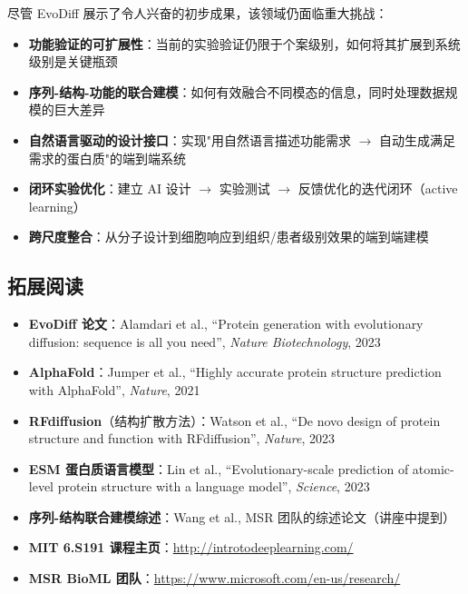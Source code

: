 尽管 EvoDiff 展示了令人兴奋的初步成果，该领域仍面临重大挑战：

\begin{itemize}
    \item \textbf{功能验证的可扩展性}：当前的实验验证仍限于个案级别，如何将其扩展到系统级别是关键瓶颈
    \item \textbf{序列-结构-功能的联合建模}：如何有效融合不同模态的信息，同时处理数据规模的巨大差异
    \item \textbf{自然语言驱动的设计接口}：实现"用自然语言描述功能需求 $\rightarrow$ 自动生成满足需求的蛋白质"的端到端系统
    \item \textbf{闭环实验优化}：建立 AI 设计 $\rightarrow$ 实验测试 $\rightarrow$ 反馈优化的迭代闭环（active learning）
    \item \textbf{跨尺度整合}：从分子设计到细胞响应到组织/患者级别效果的端到端建模
\end{itemize}

\subsection{拓展阅读}

\begin{itemize}
    \item \textbf{EvoDiff 论文}：Alamdari et al., ``Protein generation with evolutionary diffusion: sequence is all you need'', \textit{Nature Biotechnology}, 2023
    \item \textbf{AlphaFold}：Jumper et al., ``Highly accurate protein structure prediction with AlphaFold'', \textit{Nature}, 2021
    \item \textbf{RFdiffusion}（结构扩散方法）：Watson et al., ``De novo design of protein structure and function with RFdiffusion'', \textit{Nature}, 2023
    \item \textbf{ESM 蛋白质语言模型}：Lin et al., ``Evolutionary-scale prediction of atomic-level protein structure with a language model'', \textit{Science}, 2023
    \item \textbf{序列-结构联合建模综述}：Wang et al., MSR 团队的综述论文（讲座中提到）
    \item \textbf{MIT 6.S191 课程主页}：\url{http://introtodeeplearning.com/}
    \item \textbf{MSR BioML 团队}：\url{https://www.microsoft.com/en-us/research/}
\end{itemize}



